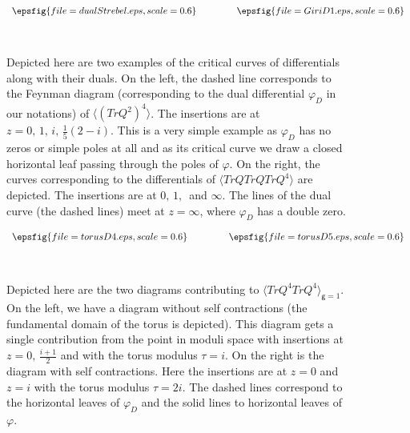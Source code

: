 \documentclass[11pt]{JHEP3}
\def\vf{\varphi}
\def\gg{\mathsf g }
\begin{document}
\begin{figure}[htbp]
 \begin{center}
$\begin{array}{c@{\hspace{0.6in\vspace{0.3in}}}c}
\epsfig{file=dualStrebel.eps,scale=0.6}&\epsfig{file=GiriD1.eps,scale=0.6}
\\ [0.2cm]
\end{array}$
\caption{Depicted here are two examples of the critical curves of differentials along with their duals. On the left, the dashed
line corresponds to the Feynman diagram (corresponding to the dual differential $\vf_D$ in our notations) of $\langle\left(TrQ^2\right)^4\rangle$. The insertions are at $z=0,\,1,\,i,\,\frac{1}{5}(2-i)$. 
This is a very simple example as $\vf_D$ has no zeros or simple poles at all and as its critical curve we draw a closed 
horizontal leaf passing through the poles of $\vf$. On the right, the curves corresponding
to the differentials of  $\langle TrQTrQTrQ^4\rangle$ are depicted. The insertions are at $0,\,1,\,$ and $\infty$. The lines of the dual curve (the dashed lines) meet at $z=\infty$, where $\vf_D$ 
has a double zero. 
}\label{DualStrebel}
\end{center}
\end{figure}
\begin{figure}[htbp]
 \begin{center}
$\begin{array}{c@{\hspace{0.6in\vspace{0.3in}}}c}
\epsfig{file=torusD4.eps,scale=0.6}&\epsfig{file=torusD5.eps,scale=0.6}
\\ [0.2cm]
\end{array}$
\caption{Depicted here are the two diagrams contributing to $\langle TrQ^4TrQ^4\rangle_{\gg=1}$. On the left, we have a diagram without self contractions
(the fundamental domain of the torus is depicted).
This diagram gets a single contribution from the point in moduli space with insertions at $z=0,\,\frac{i+1}{2}$ and with the torus modulus $\tau=i$. 
On the right is the diagram with self contractions. Here the insertions are at $z=0$ and $z=i$ with the torus modulus $\tau=2i$. 
The dashed lines correspond to the horizontal leaves of $\vf_D$  and the solid lines to horizontal leaves of $\vf$.
}\label{DualStrebel2}
\end{center}
\end{figure}
\end{document}
